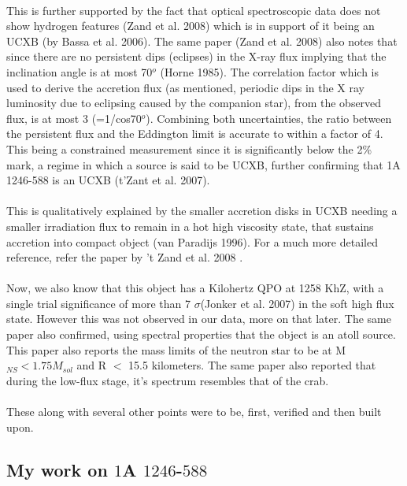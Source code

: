\documentclass[a4paper,twoside]{report}
\numberwithin{equation}{section}
\begin{document}
\paragraph{}
This is further supported by the fact that optical spectroscopic data does not show hydrogen features (Zand et al. 2008) which is in support of it being an UCXB (by Bassa et al. 2006). The same paper (Zand et al. 2008) also notes that since there are no persistent dips (eclipses) in the X-ray flux implying that the inclination angle is at most 70$^o$ (Horne 1985). The correlation factor which is used to derive the accretion flux (as mentioned, periodic dips in the X ray luminosity due to eclipsing caused by the companion star), from the observed flux, is at most 3 (=1/cos70$^o$). Combining both uncertainties, the ratio between the persistent flux and the Eddington limit is accurate to within a factor of 4. This being a constrained measurement since it is significantly below the 2\% mark, a regime in which a source is said to be UCXB, further confirming that 1A 1246-588 is an UCXB (t'Zant et al. 2007). 
\paragraph{}
This is qualitatively explained by the smaller accretion disks in UCXB needing a smaller irradiation flux to remain in a hot high viscosity state, that sustains accretion into compact object (van Paradijs 1996). For a much more detailed reference, refer the paper by 't Zand et al. 2008 \cite{t'Zand}.
\paragraph{}
Now, we also know that this object has a Kilohertz QPO at 1258 KhZ, with a single trial significance of more than 7 $\sigma$(Jonker et al. 2007) in the soft high flux state. However this was not observed in our data, more on that later. The same paper also confirmed, using spectral properties that the object is an atoll source. This paper also reports the mass limits of the neutron star to be at M$_{NS} < 1.75 M_{sol}$ and R $<$ 15.5 kilometers. The same paper also reported that during the low-flux stage, it's spectrum resembles that of the crab.
\paragraph{}
These along with several other points were to be, first, verified and then built upon.
\subsection{My work on $1$A $1246$-$588$}
\end{document}

